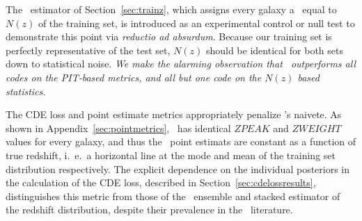 The \trainz\ estimator of Section~\ref{sec:trainz}, which assigns every galaxy a \pzpdf\ equal to $N(z)$ of the training set, is introduced as an experimental control or null test to demonstrate this point via \textit{reductio ad absurdum}.
Because our training set is perfectly representative of the test set, $N(z)$ should be identical for both sets down to statistical noise.
\textit{We make the alarming observation that \trainz\ outperforms all codes on the PIT-based metrics, and all but one code on the $N(z)$ based statistics.}

The CDE loss and point estimate metrics appropriately penalize \trainz's naivete.
As shown in Appendix~\ref{sec:pointmetrics}, \trainz ~has identical $ZPEAK$ and $ZWEIGHT$ values for every galaxy, and thus the \pz\ point estimats are constant as a function of true redshift, i.~e.~a horizontal line at the mode and mean of the training set distribution respectively.
The explicit dependence on the individual posteriors in the calculation of the CDE loss, described in Section~\ref{sec:cdelossresults}, distinguishes this metric from those of the \pzpdf\ ensemble and stacked estimator of the redshift distribution, despite their prevalence in the \pz\ literature.

